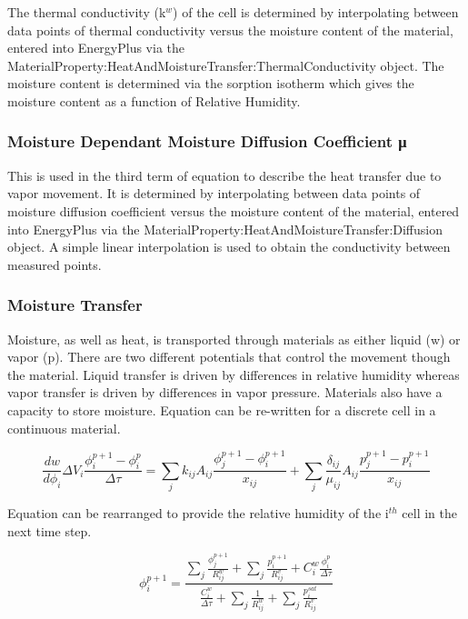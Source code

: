 The thermal conductivity (k\(^{w}\)) of the cell is determined by interpolating between data points of thermal conductivity versus the moisture content of the material, entered into EnergyPlus via the MaterialProperty:HeatAndMoistureTransfer:ThermalConductivity object. The moisture content is determined via the sorption isotherm which gives the moisture content as a function of Relative Humidity.

\subsubsection{Moisture Dependant Moisture Diffusion Coefficient μ}\label{moisture-dependant-moisture-diffusion-coefficient-ux3bc}

This is used in the third term of equation to describe the heat transfer due to vapor movement. It is determined by interpolating between data points of moisture diffusion coefficient versus the moisture content of the material, entered into EnergyPlus via the MaterialProperty:HeatAndMoistureTransfer:Diffusion object. A simple linear interpolation is used to obtain the conductivity between measured points.

\subsubsection{Moisture Transfer}\label{moisture-transfer}

Moisture, as well as heat, is transported through materials as either liquid (w) or vapor (p). There are two different potentials that control the movement though the material. Liquid transfer is driven by differences in relative humidity whereas vapor transfer is driven by differences in vapor pressure. Materials also have a capacity to store moisture. Equation can be re-written for a discrete cell in a continuous material.

\begin{equation}
\frac{{dw}}{{d{\phi_i}}}\Delta {V_i}\frac{{\phi_i^{p + 1} - \phi_i^p}}{{\Delta \tau }} = \sum\limits_j {{k_{ij}}{A_{ij}}\frac{{\phi_j^{p + 1} - \phi_i^{p + 1}}}{{{x_{ij}}}}}  + \sum\limits_j {\frac{{{\delta_{ij}}}}{{{\mu_{ij}}}}{A_{ij}}\frac{{p_j^{p + 1} - p_i^{p + 1}}}{{{x_{ij}}}}}
\end{equation}

Equation can be rearranged to provide the relative humidity of the i\(^{th}\) cell in the next time step.

\begin{equation}
\phi_i^{p + 1} = \frac{{\sum\nolimits_j {\frac{{\phi_j^{p + 1}}}{{R_{ij}^w}}}  + \sum\nolimits_j {\frac{{p_i^{p + 1}}}{{R_{ij}^v}}}  + C_i^w\frac{{\phi_i^p}}{{\Delta \tau }}}}{{\frac{{C_i^w}}{{\Delta \tau }} + \sum\nolimits_j {\frac{1}{{R_{ij}^w}} + \sum\nolimits_j {\frac{{p_i^{sat}}}{{R_{ij}^v}}} } }}
\end{equation}

